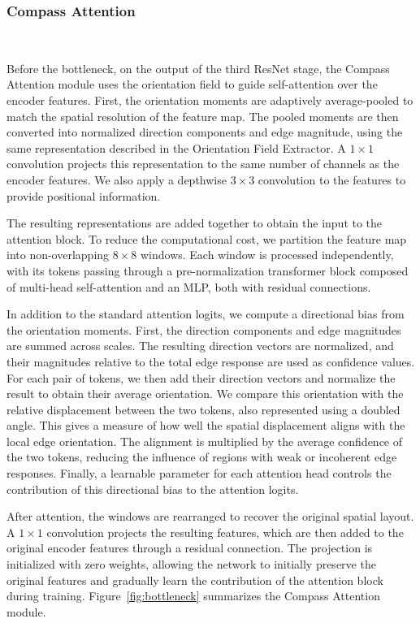 \documentclass[sigconf]{acmart}
\begin{document}
\subsubsection{Compass Attention}\mbox{}\

Before the bottleneck, on the output of the third ResNet stage, the Compass Attention module uses the orientation field to guide self-attention over the encoder features. First, the orientation moments are adaptively average-pooled to match the spatial resolution of the feature map. The pooled moments are then converted into normalized direction components and edge magnitude, using the same representation described in the Orientation Field Extractor. A $1 \times 1$ convolution projects this representation to the same number of channels as the encoder features. We also apply a depthwise $3 \times 3$ convolution to the features to provide positional information.

The resulting representations are added together to obtain the input to the attention block. To reduce the computational cost, we partition the feature map into non-overlapping $8 \times 8$ windows. Each window is processed independently, with its tokens passing through a pre-normalization transformer block composed of multi-head self-attention and an MLP, both with residual connections.

In addition to the standard attention logits, we compute a directional bias from the orientation moments. First, the direction components and edge magnitudes are summed across scales. The resulting direction vectors are normalized, and their magnitudes relative to the total edge response are used as confidence values. For each pair of tokens, we then add their direction vectors and normalize the result to obtain their average orientation. We compare this orientation with the relative displacement between the two tokens, also represented using a doubled angle. This gives a measure of how well the spatial displacement aligns with the local edge orientation. The alignment is multiplied by the average confidence of the two tokens, reducing the influence of regions with weak or incoherent edge responses. Finally, a learnable parameter for each attention head controls the contribution of this directional bias to the attention logits.

After attention, the windows are rearranged to recover the original spatial layout. A $1 \times 1$ convolution projects the resulting features, which are then added to the original encoder features through a residual connection. The projection is initialized with zero weights, allowing the network to initially preserve the original features and gradually learn the contribution of the attention block during training. Figure~\ref{fig:bottleneck} summarizes the Compass Attention module.
\end{document}
